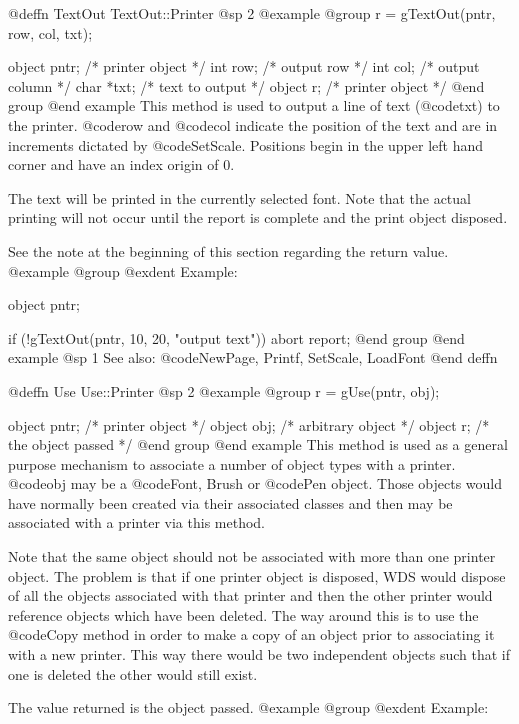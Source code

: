 @deffn {TextOut} TextOut::Printer
@sp 2
@example
@group
r = gTextOut(pntr, row, col, txt); 

object  pntr;   /*  printer object  */
int     row;    /*  output row      */
int     col;    /*  output column   */
char    *txt;   /*  text to output  */
object  r;      /*  printer object  */
@end group
@end example
This method is used to output a line of text (@code{txt}) to the printer.
@code{row} and @code{col} indicate the position of the text and are in
increments dictated by @code{SetScale}.  Positions begin in the upper
left hand corner and have an index origin of 0.

The text will be printed in the currently selected font.  Note that the
actual printing will not occur until the report is complete and the
print object disposed.

See the note at the beginning of this section regarding the return value.
@example
@group
@exdent Example:

object  pntr;

if (!gTextOut(pntr, 10, 20, "output text"))
        abort report;
@end group
@end example
@sp 1
See also:  @code{NewPage, Printf, SetScale, LoadFont}
@end deffn







@deffn {Use} Use::Printer
@sp 2
@example
@group
r = gUse(pntr, obj);

object  pntr;   /*  printer object     */
object  obj;    /*  arbitrary object   */
object  r;      /*  the object passed  */
@end group
@end example
This method is used as a general purpose mechanism to associate a
number of object types with a printer.  @code{obj} may be a @code{Font,
Brush} or @code{Pen} object.  Those objects would have normally been
created via their associated classes and then may be associated with a
printer via this method.

Note that the same object should not be associated with more than one
printer object.  The problem is that if one printer object is disposed, WDS
would dispose of all the objects associated with that printer and then the
other printer would reference objects which have been deleted.  The way
around this is to use the @code{Copy} method in order to make a copy of
an object prior to associating it with a new printer.  This way there would
be two independent objects such that if one is deleted the other would
still exist.

The value returned is the object passed.
@example
@group
@exdent Example:

